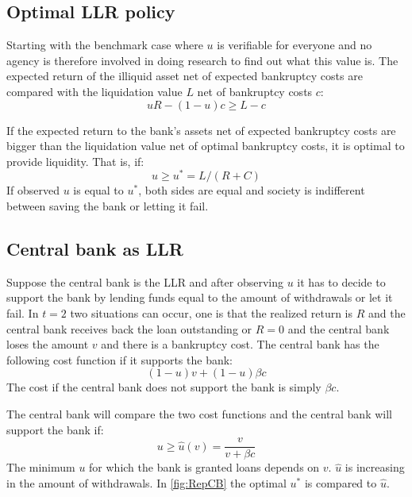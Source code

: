 \documentclass[twoside, 12pt]{article}
\numberwithin{equation}{section}
\begin{document}
\subsection{Optimal LLR policy}
Starting with the benchmark case where $u$ is verifiable for everyone and no agency is therefore involved in doing research to find out what this value is. The expected return of the illiquid asset net of expected bankruptcy costs are compared with the liquidation value $L$ net of bankruptcy costs $c$:
\begin{equation}\label{eq:a}
uR-(1-u)c \geq L-c
\end{equation}

If the expected return to the bank's assets net of expected bankruptcy costs are bigger than the liquidation value net of optimal bankruptcy costs, it is optimal to provide liquidity. That is, if:
\begin{equation}\label{optimalrepullo}
u\geq u^*= L/(R+C)
\end{equation}
If observed $u$ is equal to $u^*$, both sides are equal and society is indifferent between saving the bank or letting it fail.

\subsection{Central bank as LLR}
Suppose the central bank is the LLR and after observing $u$ it has to decide to support the bank by lending funds equal to the amount of withdrawals or let it fail. In $t=2$ two situations can occur, one is that the realized return is $R$ and the central bank receives back the loan outstanding or $R=0$ and the central bank loses the amount $v$ and there is a bankruptcy cost. The central bank has the following cost function if it supports the bank:
\begin{equation}
(1-u)v+(1-u)\beta c
\end{equation}
The cost if the central bank does not support the bank is simply $\beta c$.

The central bank will compare the two cost functions and the central bank will support the bank if:
\begin{equation}\label{eq6}
u\geq \hat{u}(v)=\frac{v}{v+\beta c}
\end{equation}
The minimum $u$ for which the bank is granted loans depends on $v$. $\hat{u}$ is increasing in the amount of withdrawals. In \autoref{fig:RepCB} the optimal $u^*$ is compared to $\hat{u}$.
\end{document}
